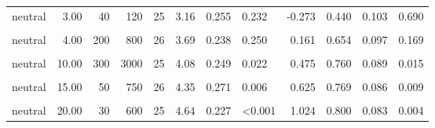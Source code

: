\documentclass[
]{article}
\begin{document}
\begin{longtable}[t]{lrrrrrrlrrrl}
\hspace{1em}neutral & 3.00 & 40 & 120 & 25 & 3.16 & 0.255 & 0.232 & -0.273 & 0.440 & 0.103 & 0.690\\
\hspace{1em}\cellcolor{gray!10}{neutral} & \cellcolor{gray!10}{4.00} & \cellcolor{gray!10}{20} & \cellcolor{gray!10}{80} & \cellcolor{gray!10}{25} & \cellcolor{gray!10}{3.64} & \cellcolor{gray!10}{0.300} & \cellcolor{gray!10}{0.632} & \cellcolor{gray!10}{0.095} & \cellcolor{gray!10}{0.560} & \cellcolor{gray!10}{0.103} & \cellcolor{gray!10}{0.690}\\
\hspace{1em}neutral & 4.00 & 200 & 800 & 26 & 3.69 & 0.238 & 0.250 & 0.161 & 0.654 & 0.097 & 0.169\\
\hspace{1em}\cellcolor{gray!10}{neutral} & \cellcolor{gray!10}{10.00} & \cellcolor{gray!10}{40} & \cellcolor{gray!10}{400} & \cellcolor{gray!10}{26} & \cellcolor{gray!10}{4.27} & \cellcolor{gray!10}{0.256} & \cellcolor{gray!10}{0.007} & \cellcolor{gray!10}{0.600} & \cellcolor{gray!10}{0.731} & \cellcolor{gray!10}{0.090} & \cellcolor{gray!10}{0.029}\\
\hspace{1em}neutral & 10.00 & 300 & 3000 & 25 & 4.08 & 0.249 & 0.022 & 0.475 & 0.760 & 0.089 & 0.015\\
\hspace{1em}\cellcolor{gray!10}{neutral} & \cellcolor{gray!10}{15.00} & \cellcolor{gray!10}{20} & \cellcolor{gray!10}{300} & \cellcolor{gray!10}{25} & \cellcolor{gray!10}{3.72} & \cellcolor{gray!10}{0.292} & \cellcolor{gray!10}{0.297} & \cellcolor{gray!10}{0.154} & \cellcolor{gray!10}{0.680} & \cellcolor{gray!10}{0.097} & \cellcolor{gray!10}{0.108}\\
\hspace{1em}neutral & 15.00 & 50 & 750 & 26 & 4.35 & 0.271 & 0.006 & 0.625 & 0.769 & 0.086 & 0.009\\
\hspace{1em}\cellcolor{gray!10}{neutral} & \cellcolor{gray!10}{20.00} & \cellcolor{gray!10}{10} & \cellcolor{gray!10}{200} & \cellcolor{gray!10}{22} & \cellcolor{gray!10}{3.96} & \cellcolor{gray!10}{0.366} & \cellcolor{gray!10}{0.166} & \cellcolor{gray!10}{0.271} & \cellcolor{gray!10}{0.727} & \cellcolor{gray!10}{0.099} & \cellcolor{gray!10}{0.052}\\
\hspace{1em}neutral & 20.00 & 30 & 600 & 25 & 4.64 & 0.227 & <0.001 & 1.024 & 0.800 & 0.083 & 0.004\\

\end{longtable}
\end{document}
